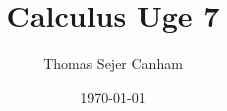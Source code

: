 \documentclass{article}
\title{Calculus Uge 7}
\author{Thomas Sejer Canham}
\date{\today}
\begin{document}
\begin{titlepage}
 \maketitle
 \thispagestyle{empty}
\end{titlepage}
\end{document}
